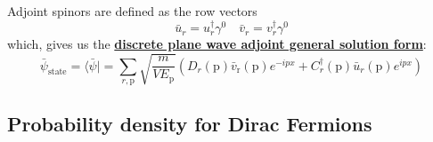 Adjoint spinors are defined as the row vectors
\begin{equation}
\bar{u}_{r}=u_{r}^{\dagger} \gamma^{0} \quad \bar{v}_{r}=v_{r}^{\dagger} \gamma^{0}
\end{equation}
which, gives us the \textbf{\underline{discrete plane wave adjoint general solution form}}:
\begin{equation}
\bar{\psi}_{\text {state}}=\langle\bar{\psi}|=\sum_{r, \mathrm{p}} \sqrt{\frac{m}{V E_{\mathrm{p}}}}\left(D_{r}(\mathrm{p}) \bar{v}_{\mathrm{r}}(\mathrm{p}) e^{-i p x}+C_{r}^{\dagger}(\mathrm{p}) \bar{u}_{r}(\mathrm{p}) e^{i p x}\right)
\end{equation}
\subsection{Probability density for Dirac Fermions}
